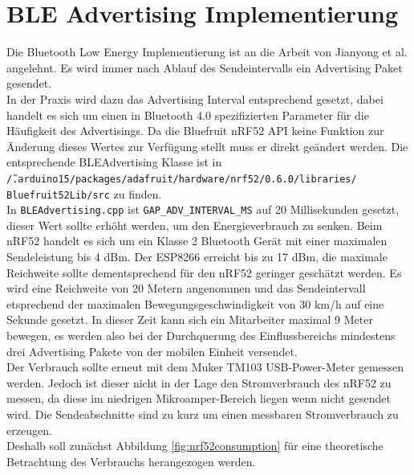 \section{BLE Advertising Implementierung}
\label{ch:phase3:sec:advertising}
Die Bluetooth Low Energy Implementierung ist an die Arbeit von Jianyong et al. angelehnt.
Es wird immer nach Ablauf des Sendeintervalls ein Advertising Paket gesendet.\\
In der Praxis wird dazu das Advertising Interval entsprechend gesetzt, dabei handelt es sich um einen in Bluetooth 4.0 spezifizierten Parameter für die Häufigkeit des Advertisings.
Da die Bluefruit nRF52 API keine Funktion zur Änderung dieses Wertes zur Verfügung stellt muss er direkt geändert werden.
Die entsprechende BLEAdvertising Klasse ist in \\\texttt{\~/.arduino15/packages/adafruit/hardware/nrf52/0.6.0/libraries/}\\\texttt{Bluefruit52Lib/src} zu finden. \\
In \texttt{BLEAdvertising.cpp} ist \texttt{GAP\_ADV\_INTERVAL\_MS} auf 20 Millisekunden gesetzt, dieser Wert sollte erhöht werden, um den Energieverbrauch zu senken.
Beim nRF52 handelt es sich um ein Klasse 2 Bluetooth Gerät mit einer maximalen Sendeleistung bis 4 dBm.
Der ESP8266 erreicht bis zu 17 dBm, die maximale Reichweite sollte dementsprechend für den nRF52 geringer geschätzt werden.
Es wird eine Reichweite von 20 Metern angenommen und das Sendeintervall etsprechend der maximalen Bewegungsgeschwindigkeit von 30 km/h auf eine Sekunde gesetzt. 
In dieser Zeit kann sich ein Mitarbeiter maximal 9 Meter bewegen, es werden also bei der Durchquerung des Einflussbereichs mindestens drei Advertising Pakete von der mobilen Einheit versendet.\\
Der Verbrauch sollte erneut mit dem Muker TM103 USB-Power-Meter gemessen werden.
Jedoch ist dieser nicht in der Lage den Stromverbrauch des nRF52 zu messen, da diese im niedrigen Mikroamper-Bereich liegen wenn nicht gesendet wird.
Die Sendeabschnitte sind zu kurz um einen messbaren Stromverbrauch zu erzeugen.\\
Deshalb soll zunächst Abbildung \ref{fig:nrf52consumption} für eine theoretische Betrachtung des Verbrauchs herangezogen werden. 

